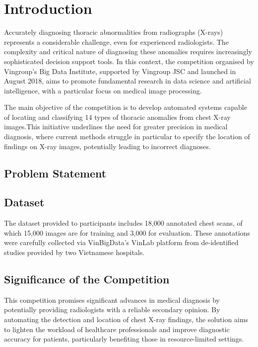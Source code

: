 \documentclass[12pt,oneside]{book} %
\begin{document}
\chapter{Introduction}

Accurately diagnosing thoracic abnormalities from radiographs (X-rays)
represents a considerable challenge, even for experienced radiologists. The
complexity and critical nature of diagnosing these anomalies requires
increasingly sophisticated decision support tools. In this context, the
competition organised by Vingroup's Big Data Institute, supported by Vingroup
JSC and launched in August 2018, aims to promote fundamental research in data
science and artificial intelligence, with a particular focus on medical image
processing.

The main objective of the competition is to develop automated systems capable
of locating and classifying 14 types of thoracic anomalies from chest X-ray
images.This initiative underlines the need for greater precision in medical
diagnosis, where current methods struggle in particular to specify the location
of findings on X-ray images, potentially leading to incorrect diagnoses.

\section{Problem Statement}

\section{Dataset}

The dataset provided to participants includes 18,000 annotated chest scans, of
which 15,000 images are for training and 3,000 for evaluation. These
annotations were carefully collected via VinBigData's VinLab platform from
de-identified studies provided by two Vietnamese hospitals.

\section{Significance of the Competition}

This competition promises significant advances in medical diagnosis by
potentially providing radiologists with a reliable secondary opinion. By
automating the detection and location of chest X-ray findings, the solution
aims to lighten the workload of healthcare professionals and improve diagnostic
accuracy for patients, particularly benefiting those in resource-limited
settings.
\end{document}
